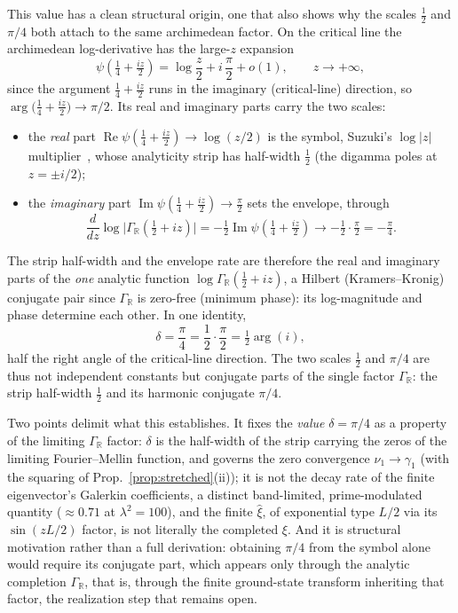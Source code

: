 \documentclass[11pt,a4paper]{article}
\begin{document}
This value has a clean structural origin, one that also shows why the scales
$\tfrac12$ and $\pi/4$ both attach to the same archimedean factor. On the
critical line the archimedean log-derivative has the large-$z$ expansion
\begin{equation}\label{eq:digamma-split}
  \psi\!\left(\tfrac14+\tfrac{iz}{2}\right)=\log\frac{z}{2}
  +i\,\frac{\pi}{2}+o(1),\qquad z\to+\infty,
\end{equation}
since the argument $\tfrac14+\tfrac{iz}{2}$ runs in the imaginary
(critical-line) direction, so $\arg\bigl(\tfrac14+\tfrac{iz}{2}\bigr)\to\pi/2$.
Its real and imaginary parts carry the two scales:
\begin{itemize}
\item the \emph{real} part $\operatorname{Re}\psi(\tfrac14+\tfrac{iz}{2})\to
  \log(z/2)$ is the symbol, Suzuki's $\log|z|$ multiplier~\cite{Suzuki2026},
  whose analyticity strip has half-width $\tfrac12$ (the digamma poles at
  $z=\pm i/2$);
\item the \emph{imaginary} part $\operatorname{Im}\psi(\tfrac14+\tfrac{iz}{2})\to
  \tfrac{\pi}{2}$ sets the envelope, through
  \[
    \frac{d}{dz}\log\bigl|\Gamma_\mathbb{R}(\tfrac12+iz)\bigr|
    =-\tfrac12\operatorname{Im}\psi\!\left(\tfrac14+\tfrac{iz}{2}\right)
    \longrightarrow-\tfrac12\cdot\tfrac{\pi}{2}=-\tfrac{\pi}{4}.
  \]
\end{itemize}
The strip half-width and the envelope rate are therefore the real and imaginary
parts of the \emph{one} analytic function $\log\Gamma_\mathbb{R}(\tfrac12+iz)$,
a Hilbert (Kramers--Kronig) conjugate pair since $\Gamma_\mathbb{R}$ is zero-free
(minimum phase): its log-magnitude and phase determine each other. In one
identity,
\begin{equation}\label{eq:pi4}
  \delta=\frac{\pi}{4}=\frac12\cdot\frac{\pi}{2}=\tfrac12\arg(i),
\end{equation}
half the right angle of the critical-line direction. The two scales $\tfrac12$
and $\pi/4$ are thus not independent constants but conjugate parts of the single
factor $\Gamma_\mathbb{R}$: the strip half-width $\tfrac12$ and its harmonic
conjugate $\pi/4$.

Two points delimit what this establishes. It fixes the \emph{value}
$\delta=\pi/4$ as a property of the limiting $\Gamma_\mathbb{R}$ factor: $\delta$
is the half-width of the strip carrying the zeros of the limiting Fourier--Mellin
function, and governs the zero convergence $\nu_1\to\gamma_1$ (with the squaring
of Prop.~\ref{prop:stretched}(ii)); it is not the decay rate of the finite
eigenvector's Galerkin coefficients, a distinct band-limited, prime-modulated
quantity ($\approx0.71$ at $\lambda^2=100$), and the finite $\widehat\xi$, of
exponential type $L/2$ via its $\sin(zL/2)$ factor, is not literally the completed
$\xi$. And it is structural motivation rather than a full derivation: obtaining
$\pi/4$ from the symbol alone would require its conjugate part, which appears only
through the analytic completion $\Gamma_\mathbb{R}$, that is, through the finite
ground-state transform inheriting that factor, the realization step that remains
open.
\end{document}
